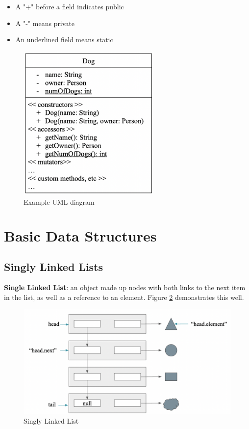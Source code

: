 \documentclass[12pt]{article}
\begin{document}
\begin{itemize}
    \item A "+" before a field indicates public
    \item A "-" means private
    \item An underlined field means static
\end{itemize}

\begin{figure}[!ht]
    \centering
    \includegraphics[width=7cm]{misc/uml_example.png}
    \caption{Example UML diagram}
    \label{fig:uml_example}
\end{figure}

\section{Basic Data Structures}
\subsection{Singly Linked Lists}
\textbf{Single Linked List}: an object made up nodes with both links to the next item in the list, as well as a reference to an element. Figure \ref{fig:singlylinked} demonstrates this well.

\begin{figure}[!ht]
    \centering
    \includegraphics[width=12cm]{misc/singlylinkedlist.png}
    \caption{Singly Linked List}
    \label{fig:singlylinked}
\end{figure}
\end{document}
